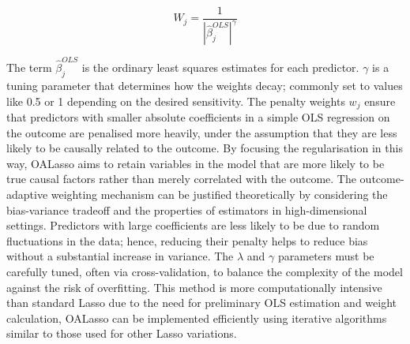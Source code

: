 \begin{equation} \label{eq:oalssobound}W_{j} = \frac{1}{|\hat{\beta}_{j}^{OLS}|^{\gamma}}\end{equation}

\noindent The term \(\hat{\beta}_{j}^{OLS}\) is the ordinary least squares estimates for each predictor. \(\gamma\) is a tuning parameter that determines how the weights decay; commonly set to values like 0.5 or 1 depending on the desired sensitivity. The penalty weights \(w_{j}\) ensure that predictors with smaller absolute coefficients in a simple OLS regression on the outcome are penalised more heavily, under the assumption that they are less likely to be causally related to the outcome. By focusing the regularisation in this way, \parencite{shortreed_outcome-adaptive_2017} OALasso aims to retain variables in the model that are more likely to be true causal factors rather than merely correlated with the outcome. The outcome-adaptive weighting mechanism can be justified theoretically by considering the bias-variance tradeoff and the properties of estimators in high-dimensional settings. Predictors with large coefficients are less likely to be due to random fluctuations in the data; hence, reducing their penalty helps to reduce bias without a substantial increase in variance. The \(\lambda\) and \(\gamma\) parameters must be carefully tuned, often via cross-validation, to balance the complexity of the model against the risk of overfitting. This method is more computationally intensive than standard Lasso due to the need for preliminary OLS estimation and weight calculation, OALasso can be implemented efficiently using iterative algorithms \parencite{shortreed_outcome-adaptive_2017} similar to those used for other Lasso variations.


